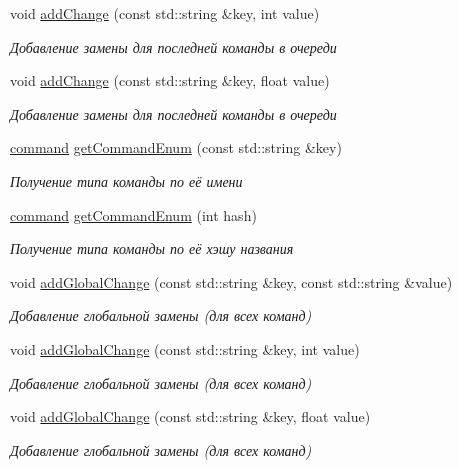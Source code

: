 \begin{DoxyCompactItemize}
void \hyperlink{class_command_manager_class_a4fd62440f21e89926139919b3c8a6c57}{add\+Change} (const std\+::string \&key, int value)
\begin{DoxyCompactList}\small\item\em Добавление замены для последней команды в очереди \end{DoxyCompactList}\item 
void \hyperlink{class_command_manager_class_a19da484b342cecba8f383c442e92ad12}{add\+Change} (const std\+::string \&key, float value)
\begin{DoxyCompactList}\small\item\em Добавление замены для последней команды в очереди \end{DoxyCompactList}\item 
\hyperlink{class_command_manager_class_aff5b4b6301c24b585b22c6abaf4f3131}{command} \hyperlink{class_command_manager_class_a7b6f99c2ae5fafdf2bbf7cc25c606100}{get\+Command\+Enum} (const std\+::string \&key)
\begin{DoxyCompactList}\small\item\em Получение типа команды по её имени \end{DoxyCompactList}\item 
\hyperlink{class_command_manager_class_aff5b4b6301c24b585b22c6abaf4f3131}{command} \hyperlink{class_command_manager_class_a18080e9ab4d0890282cde8dd668dc87e}{get\+Command\+Enum} (int hash)
\begin{DoxyCompactList}\small\item\em Получение типа команды по её хэшу названия \end{DoxyCompactList}\item 
void \hyperlink{class_command_manager_class_a9c8a1526e1d2ec05205e4ebf4dc6ea62}{add\+Global\+Change} (const std\+::string \&key, const std\+::string \&value)
\begin{DoxyCompactList}\small\item\em Добавление глобальной замены (для всех команд) \end{DoxyCompactList}\item 
void \hyperlink{class_command_manager_class_a3437ce39347b4ccf81b7e5fe9821c015}{add\+Global\+Change} (const std\+::string \&key, int value)
\begin{DoxyCompactList}\small\item\em Добавление глобальной замены (для всех команд) \end{DoxyCompactList}\item 
void \hyperlink{class_command_manager_class_a433a83a02a4ecc3c498c28d0bb395c16}{add\+Global\+Change} (const std\+::string \&key, float value)
\begin{DoxyCompactList}\small\item\em Добавление глобальной замены (для всех команд) \end{DoxyCompactList}\end{DoxyCompactItemize}
